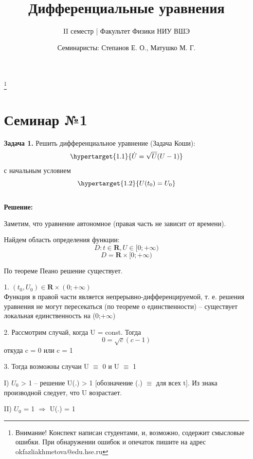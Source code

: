 \documentclass[10pt]{report}
\title{Дифференциальные уравнения}
\date{Семинаристы: Степанов Е. О., Матушко М. Г.}
\author {II семестр | Факультет Физики НИУ ВШЭ}
\begin{document}
\maketitle

\tableofcontents
\footnote{Внимание! Конспект написан студентами, и, возможно, содержит смысловые ошибки. При обнаружении ошибок и опечаток пишите на адрес okfazliakhmetova@edu.hse.ru}

\pagestyle {myheadings}
\newpage

\chapter[{Семинар №1}]{Семинар №1}
\thispagestyle{empty}
\textbf{Задача 1.} Решить дифференциальное уравнение (Задача Коши): 
\newline
\begin{equation}
\hypertarget{1.1}{\dot{U} = \sqrt{U}(U-1)}
\end{equation}
\newline
с начальным условием
\newline
\begin{equation}
\hypertarget{1.2}{U(t_0)=U_0}
\end{equation}\\
\textbf{Решение:} \par
Заметим, что уравнение автономное (правая часть не зависит от времени). \par
Найдем область определения функции:
\[
D: t \in \mathbf{R},   U \in [0; +\infty)  \]
\[ D = \mathbf{R} \times [0; +\infty) \] \par

По теореме Пеано решение существует.

1. $(t_0, U_0) \in \textbf {R} \times (0; +\infty) $\\
 Функция в правой части является непрерывно-дифференцируемой, т. е. решения уравнения не могут пересекаться (по теореме о единственности) -- существует локальная единственность на (0;$+\infty$)  \par
2. Рассмотрим случай, когда U = const. Тогда \[
0 = \sqrt {c}  (c-1)
\] откуда
c = 0  или  c = 1

3. Тогда возможны случаи U $\equiv$ 0 и U $\equiv$ 1 

I) $U_0$  > 1 -- решение  U(.) > 1 [обозначение (.) $\equiv$ для всех t]. Из знака производной следует, что U возрастает.

II) $U_0$ = 1 $\Rightarrow$  U(.) = 1
\end{document}

